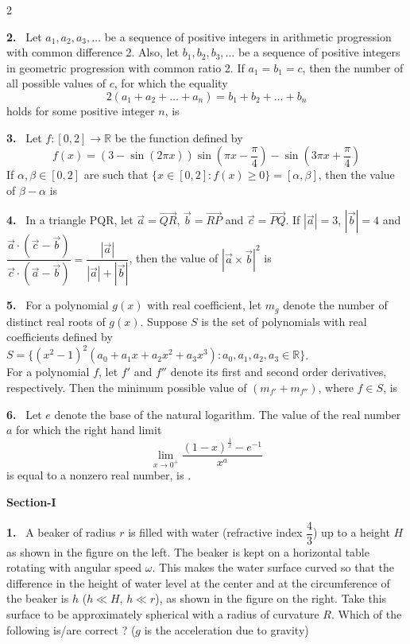 \documentclass[10pt]{extarticle}
\newcommand{\papersec}[1]{\par\bigskip{\centering\Large\bfseries PAPER-#1\par}\medskip}
\newcommand{\partsec}[2]{\par\medskip\noindent{\large\bfseries PART-#1: #2}\par\smallskip}
\newcommand{\sect}[1]{\par\smallskip\noindent\textbf{#1}\par}
\newcommand{\qn}[1]{\par\smallskip\noindent\textbf{#1.}~}
\begin{document}
\begin{multicols}{2}
\qn{2} Let $a_1,a_2,a_3,\ldots$ be a sequence of positive integers in arithmetic progression with common difference 2. Also, let $b_1,b_2,b_3,\ldots$ be a sequence of positive integers in geometric progression with common ratio 2. If $a_1=b_1=c$, then the number of all possible values of $c$, for which the equality
\[2(a_1+a_2+\ldots+a_n)=b_1+b_2+\ldots+b_n\]
holds for some positive integer $n$, is \underline{\hspace{1.5cm}}
\qn{3} Let $f:[0,2]\to\mathbb R$ be the function defined by
\[f(x)=(3-\sin(2\pi x))\sin\!\left(\pi x-\frac\pi4\right)-\sin\!\left(3\pi x+\frac\pi4\right)\]
If $\alpha,\beta\in[0,2]$ are such that $\{x\in[0,2]:f(x)\ge0\}=[\alpha,\beta]$, then the value of $\beta-\alpha$ is \underline{\hspace{1.5cm}}
\qn{4} In a triangle PQR, let $\vec a=\overrightarrow{QR}$, $\vec b=\overrightarrow{RP}$ and $\vec c=\overrightarrow{PQ}$. If $|\vec a|=3$, $|\vec b|=4$ and $\dfrac{\vec a\cdot(\vec c-\vec b)}{\vec c\cdot(\vec a-\vec b)}=\dfrac{|\vec a|}{|\vec a|+|\vec b|}$, then the value of $|\vec a\times\vec b|^2$ is \underline{\hspace{1.5cm}}
\qn{5} For a polynomial $g(x)$ with real coefficient, let $m_g$ denote the number of distinct real roots of $g(x)$. Suppose $S$ is the set of polynomials with real coefficients defined by\\
$S=\{(x^2-1)^2(a_0+a_1x+a_2x^2+a_3x^3):a_0,a_1,a_2,a_3\in\mathbb R\}$.\\
For a polynomial $f$, let $f'$ and $f''$ denote its first and second order derivatives, respectively. Then the minimum possible value of $(m_{f'}+m_{f''})$, where $f\in S$, is \underline{\hspace{1.5cm}}
\qn{6} Let $e$ denote the base of the natural logarithm. The value of the real number $a$ for which the right hand limit
\[\lim_{x\to0^+}\frac{(1-x)^{\frac1x}-e^{-1}}{x^a}\]
is equal to a nonzero real number, is \underline{\hspace{1.5cm}}.
\papersec{2}
\partsec{1}{PHYSICS}
\sect{Section-I}
\qn{1} A beaker of radius $r$ is filled with water (refractive index $\dfrac43$) up to a height $H$ as shown in the figure on the left. The beaker is kept on a horizontal table rotating with angular speed $\omega$. This makes the water surface curved so that the difference in the height of water level at the center and at the circumference of the beaker is $h$ ($h\ll H$, $h\ll r$), as shown in the figure on the right. Take this surface to be approximately spherical with a radius of curvature $R$. Which of the following is/are correct ? ($g$ is the acceleration due to gravity)

\end{multicols}
\end{document}
